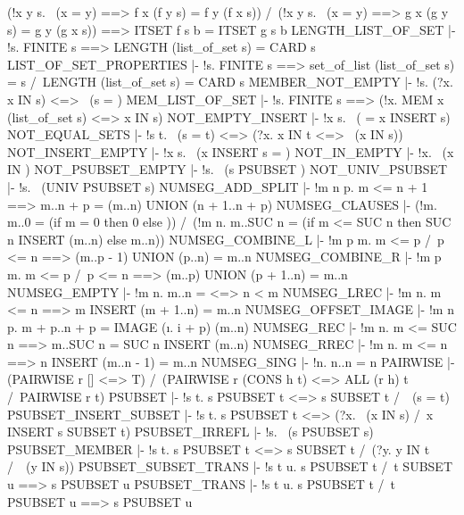          (!x y s. ~(x = y) ==> f x (f y s) = f y (f x s)) /\
         (!x y s. ~(x = y) ==> g x (g y s) = g y (g x s))
         ==> ITSET f s b = ITSET g s b
\ENDTHEOREM
\THEOREM LENGTH\_LIST\_OF\_SET
  |- !s. FINITE s ==> LENGTH (list_of_set s) = CARD s
\ENDTHEOREM
\THEOREM LIST\_OF\_SET\_PROPERTIES
  |- !s. FINITE s
         ==> set_of_list (list_of_set s) = s /\
             LENGTH (list_of_set s) = CARD s
\ENDTHEOREM
\THEOREM MEMBER\_NOT\_EMPTY
  |- !s. (?x. x IN s) <=> ~(s = {})
\ENDTHEOREM
\THEOREM MEM\_LIST\_OF\_SET
  |- !s. FINITE s ==> (!x. MEM x (list_of_set s) <=> x IN s)
\ENDTHEOREM
\THEOREM NOT\_EMPTY\_INSERT
  |- !x s. ~({} = x INSERT s)
\ENDTHEOREM
\THEOREM NOT\_EQUAL\_SETS
  |- !s t. ~(s = t) <=> (?x. x IN t <=> ~(x IN s))
\ENDTHEOREM
\THEOREM NOT\_INSERT\_EMPTY
  |- !x s. ~(x INSERT s = {})
\ENDTHEOREM
\THEOREM NOT\_IN\_EMPTY
  |- !x. ~(x IN {})
\ENDTHEOREM
\THEOREM NOT\_PSUBSET\_EMPTY
  |- !s. ~(s PSUBSET {})
\ENDTHEOREM
\THEOREM NOT\_UNIV\_PSUBSET
  |- !s. ~(UNIV PSUBSET s)
\ENDTHEOREM
\THEOREM NUMSEG\_ADD\_SPLIT
  |- !m n p. m <= n + 1 ==> m..n + p = (m..n) UNION (n + 1..n + p)
\ENDTHEOREM
\THEOREM NUMSEG\_CLAUSES
  |- (!m. m..0 = (if m = 0 then {0} else {})) /\
     (!m n. m..SUC n = (if m <= SUC n then SUC n INSERT (m..n) else m..n))
\ENDTHEOREM
\THEOREM NUMSEG\_COMBINE\_L
  |- !m p m. m <= p /\ p <= n ==> (m..p - 1) UNION (p..n) = m..n
\ENDTHEOREM
\THEOREM NUMSEG\_COMBINE\_R
  |- !m p m. m <= p /\ p <= n ==> (m..p) UNION (p + 1..n) = m..n
\ENDTHEOREM
\THEOREM NUMSEG\_EMPTY
  |- !m n. m..n = {} <=> n < m
\ENDTHEOREM
\THEOREM NUMSEG\_LREC
  |- !m n. m <= n ==> m INSERT (m + 1..n) = m..n
\ENDTHEOREM
\THEOREM NUMSEG\_OFFSET\_IMAGE
  |- !m n p. m + p..n + p = IMAGE (\i. i + p) (m..n)
\ENDTHEOREM
\THEOREM NUMSEG\_REC
  |- !m n. m <= SUC n ==> m..SUC n = SUC n INSERT (m..n)
\ENDTHEOREM
\THEOREM NUMSEG\_RREC
  |- !m n. m <= n ==> n INSERT (m..n - 1) = m..n
\ENDTHEOREM
\THEOREM NUMSEG\_SING
  |- !n. n..n = {n}
\ENDTHEOREM
\THEOREM PAIRWISE
  |- (PAIRWISE r [] <=> T) /\
     (PAIRWISE r (CONS h t) <=> ALL (r h) t /\ PAIRWISE r t)
\ENDTHEOREM
\THEOREM PSUBSET
  |- !s t. s PSUBSET t <=> s SUBSET t /\ ~(s = t)
\ENDTHEOREM
\THEOREM PSUBSET\_INSERT\_SUBSET
  |- !s t. s PSUBSET t <=> (?x. ~(x IN s) /\ x INSERT s SUBSET t)
\ENDTHEOREM
\THEOREM PSUBSET\_IRREFL
  |- !s. ~(s PSUBSET s)
\ENDTHEOREM
\THEOREM PSUBSET\_MEMBER
  |- !s t. s PSUBSET t <=> s SUBSET t /\ (?y. y IN t /\ ~(y IN s))
\ENDTHEOREM
\THEOREM PSUBSET\_SUBSET\_TRANS
  |- !s t u. s PSUBSET t /\ t SUBSET u ==> s PSUBSET u
\ENDTHEOREM
\THEOREM PSUBSET\_TRANS
  |- !s t u. s PSUBSET t /\ t PSUBSET u ==> s PSUBSET u
